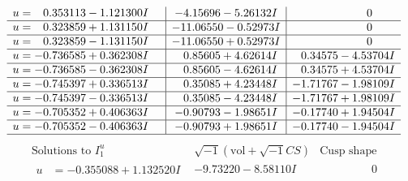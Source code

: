 \documentclass[1p]{elsarticle_modified}
\theoremstyle{definition}
\newcommand{\I}{\sqrt{-1}}
\begin{document}
$$\begin{array}{c|c|c}
\begin{aligned}
u &= \phantom{-}0.353113 - 1.121300 I\end{aligned}
 & -4.15696 - 5.26132 I & \phantom{-0.000000 } 0 \\ \hline\begin{aligned}
u &= \phantom{-}0.323859 + 1.131150 I\end{aligned}
 & -11.06550 - 0.52973 I & \phantom{-0.000000 } 0 \\ \hline\begin{aligned}
u &= \phantom{-}0.323859 - 1.131150 I\end{aligned}
 & -11.06550 + 0.52973 I & \phantom{-0.000000 } 0 \\ \hline\begin{aligned}
u &= -0.736585 + 0.362308 I\end{aligned}
 & \phantom{-}0.85605 + 4.62614 I & \phantom{-}0.34575 - 4.53704 I \\ \hline\begin{aligned}
u &= -0.736585 - 0.362308 I\end{aligned}
 & \phantom{-}0.85605 - 4.62614 I & \phantom{-}0.34575 + 4.53704 I \\ \hline\begin{aligned}
u &= -0.745397 + 0.336513 I\end{aligned}
 & \phantom{-}0.35085 + 4.23448 I & -1.71767 - 1.98109 I \\ \hline\begin{aligned}
u &= -0.745397 - 0.336513 I\end{aligned}
 & \phantom{-}0.35085 - 4.23448 I & -1.71767 + 1.98109 I \\ \hline\begin{aligned}
u &= -0.705352 + 0.406363 I\end{aligned}
 & -0.90793 - 1.98651 I & -0.17740 + 1.94504 I \\ \hline\begin{aligned}
u &= -0.705352 - 0.406363 I\end{aligned}
 & -0.90793 + 1.98651 I & -0.17740 - 1.94504 I\\
 \hline 
 \end{array}$$\newpage$$\begin{array}{c|c|c}  
\text{Solutions to }I^u_{1}& \I (\text{vol} + \sqrt{-1}CS) & \text{Cusp shape}\\
 \hline 
\begin{aligned}
u &= -0.355088 + 1.132520 I\end{aligned}
 & -9.73220 - 8.58110 I & \phantom{-0.000000 } 0 \\ \hline\begin{aligned}

\end{aligned}
\end{array}$$
\end{document}
